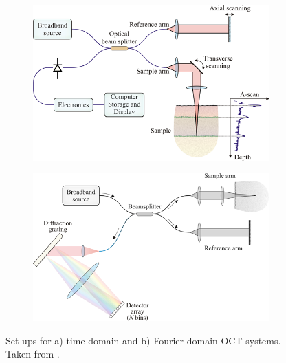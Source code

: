\begin{figure}
	\centering
    \begin{subfigure}{0.45\textwidth}
    	\centering
        \includegraphics[width=\textwidth]{bground_figs/time_domain}
    \end{subfigure}
    \quad
    \begin{subfigure}{0.45\textwidth}
    	\centering
        \includegraphics[width=\textwidth]{bground_figs/fourier_domain.png}
    \end{subfigure}
    \caption{Set ups for a) time-domain and b) Fourier-domain OCT systems. Taken from \cite{optical+biomedical_engineering_laboratory_introduction_nodate}.}
    \label{oct_domain}	
\end{figure}


